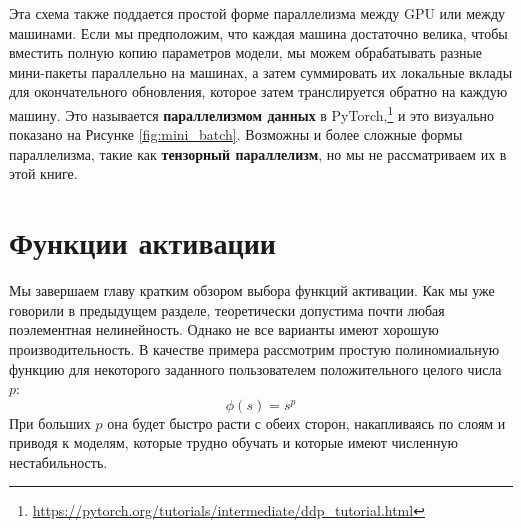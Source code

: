 Эта схема также поддается простой форме параллелизма между GPU или между машинами. Если мы предположим, что каждая машина достаточно велика, чтобы вместить полную копию параметров модели, мы можем обрабатывать разные мини-пакеты параллельно на машинах, а затем суммировать их локальные вклады для окончательного обновления, которое затем транслируется обратно на каждую машину. Это называется \textbf{параллелизмом данных} в PyTorch,\footnote{\url{https://pytorch.org/tutorials/intermediate/ddp_tutorial.html}} и это визуально показано на Рисунке \ref{fig:mini_batch}. Возможны и более сложные формы параллелизма, такие как \textbf{тензорный параллелизм}, но мы не рассматриваем их в этой книге.


\section{Функции активации}
\label{sec:activation_functions}

Мы завершаем главу кратким обзором выбора функций активации. Как мы уже говорили в предыдущем разделе, теоретически допустима почти любая поэлементная нелинейность. Однако не все варианты имеют хорошую производительность. В качестве примера рассмотрим простую полиномиальную функцию для некоторого заданного пользователем положительного целого числа $p$:
%
$$
\phi(s)=s^p
$$
%
При больших $p$ она будет быстро расти с обеих сторон, накапливаясь по слоям и приводя к моделям, которые трудно обучать и которые имеют численную нестабильность. 

